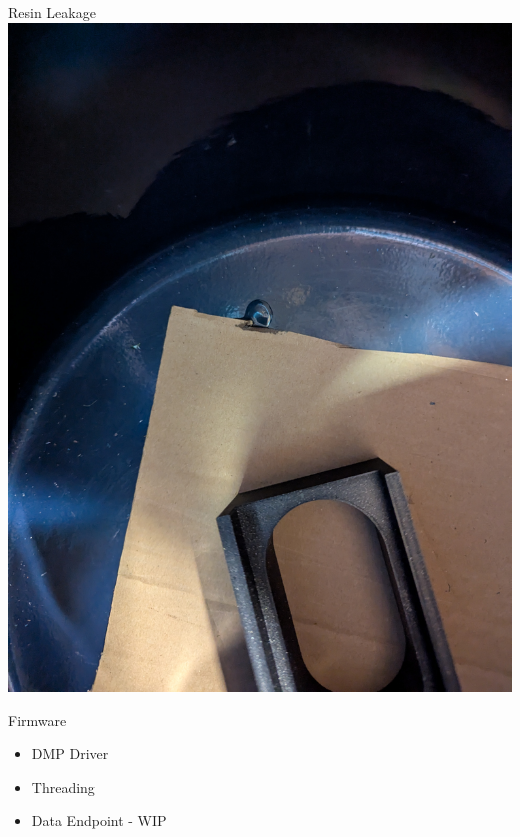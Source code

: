 \begin{frame}{Resin Leakage}
    \includegraphics[height=0.5\textheight,keepaspectratio]{images/sf_pot_leakage.jpg}
\end{frame}

\begin{frame}{Firmware}
    \begin{itemize}
        \item DMP Driver
        \item Threading
        \item Data Endpoint - WIP
    \end{itemize}
\end{frame}


